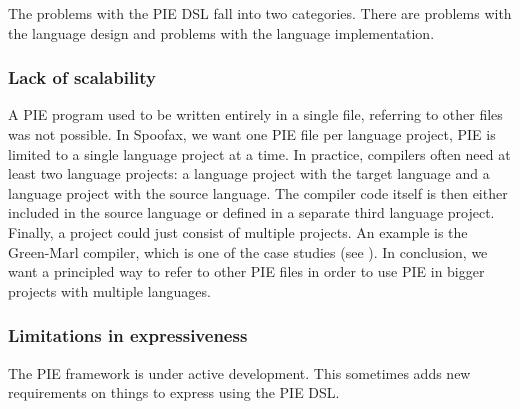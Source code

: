 The problems with the \ac{PIE} \ac{DSL} fall into two categories.
There are problems with the language design and problems with the language implementation.

\subsubsection{Lack of scalability}
\label{subsubsec:problem_analysis__problems__scalability}

A \ac{PIE} program used to be written entirely in a single file, referring to other files was not possible.
In Spoofax, we want one \ac{PIE} file per language project, \ac{PIE} is limited to a single language project at a time.
In practice, compilers often need at least two language projects: a language project with the target language and a language project with the source language.
The compiler code itself is then either included in the source language or defined in a separate third language project.
Finally, a project could just consist of multiple projects.
An example is the Green-Marl compiler, which is one of the case studies (see ).
In conclusion, we want a principled way to refer to other \ac{PIE} files in order to use \ac{PIE} in bigger projects with multiple languages.

\subsubsection{Limitations in expressiveness}
\label{subsubsec:problem_analysis__problems__expressiveness}

The \ac{PIE} framework is under active development.
This sometimes adds new requirements on things to express using the \ac{PIE} \ac{DSL}.

